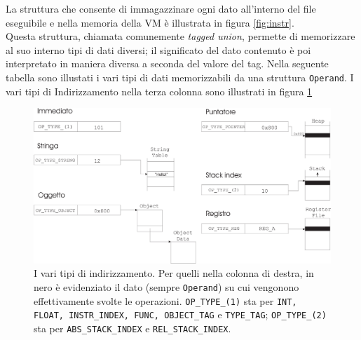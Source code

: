\documentclass[a4paper, 11pt]{article}
\newcommand{\code}[1]{\scriptsize{\texttt{#1}}\normalsize}
\begin{document}
La struttura che consente di immagazzinare ogni dato all'interno del file eseguibile e nella memoria della VM \`e illustrata in figura \ref{fig:instr}.\\
Questa struttura, chiamata comunemente \emph{tagged union}, permette di memorizzare al suo interno tipi di dati diversi; il significato del dato contenuto \`e poi interpretato in maniera diversa a seconda del valore del tag.
Nella seguente tabella sono illustati i vari tipi di dati memorizzabili da una struttura \code{Operand}.
I vari tipi di Indirizzamento nella terza colonna sono illustrati in figura \ref{fig:operands}

\begin{figure}[ht]
\centering
\includegraphics[width=\textwidth]{operands.eps}
\caption{I vari tipi di indirizzamento. Per quelli nella colonna di destra, in nero \`e evidenziato il dato (sempre \code{Operand}) su cui vengonono effettivamente svolte le operazioni. \code{OP\_TYPE\_(1)} sta per \code{INT, FLOAT, INSTR\_INDEX, FUNC, OBJECT\_TAG} e \code{TYPE\_TAG}; \code{OP\_TYPE\_(2)} sta per \code{ABS\_STACK\_INDEX} e \code{REL\_STACK\_INDEX}.}
\label{fig:operands}
\end{figure}
\end{document}
